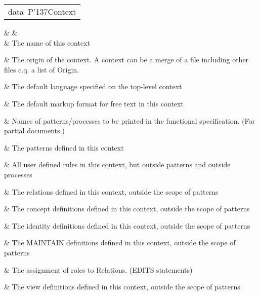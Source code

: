 \begin{haddockdesc}
\item[\begin{tabular}{@{}l}
data\ P{\char '137}Context
\end{tabular}]\haddockbegindoc
\haddockbeginconstrs
\haddockdecltt{=} &  & \\
                     & The name of this context

                     & The origin of the context. A context can be a merge of a file including other files c.q. a list of Origin.

                     & The default language specified on the top-level context

                     & The default markup format for free text in this context

                     & Names of patterns/processes to be printed in the functional specification. (For partial documents.)

                     & The patterns defined in this context

                     & All user defined rules in this context, but outside patterns and outside processes

                     & The relations defined in this context, outside the scope of patterns

                     & The concept definitions defined in this context, outside the scope of patterns

                     & The identity definitions defined in this context, outside the scope of patterns

                     & The MAINTAIN definitions defined in this context, outside the scope of patterns

                     & The assignment of roles to Relations. (EDITS statements)

                     & The view definitions defined in this context, outside the scope of patterns


\end{haddockdesc}
